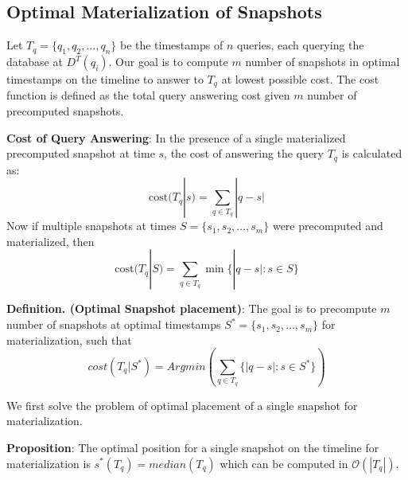 \subsection{Optimal Materialization of Snapshots}
Let $T_q = \{q_1, q_2, \dots, q_n\}$ be the timestamps of $n$ queries, each 
querying the database at $D^T(q_i)$. Our goal is to compute $m$ number of snapshots in optimal timestamps on the timeline to answer to $T_q$ at lowest possible cost. The cost function is defined as the total query answering cost given $m$ number of precomputed snapshots.

\textbf{Cost of Query Answering}: In the presence of a single materialized precomputed snapshot at time $s$, the cost of answering the query $T_q$ is calculated as:
$$\mathrm{cost}(T_q | s) = \sum_{q\in T_q} |q - s|$$
Now if multiple snapshots at times $S=\{s_1, s_2, \dots, s_m\}$ were precomputed and materialized, then 
$$\mathrm{cost}(T_q|S) = \sum_{q\in T_q} \min\{|q-s| : s\in S\}$$

\textbf{Definition. (Optimal Snapshot placement)}: The goal is to precompute $m$ number of snapshots at optimal timestamps $S^*=\{s_1, s_2, \dots, s_m\}$ for materialization, such that 
$$cost(T_q|S^*)= Arg min(\sum_{q\in T_q}\{|q - s|:s \in S^*\})$$

We first solve the problem of optimal placement of a single snapshot for materialization.

\textbf{Proposition}: The optimal position for a single snapshot on the timeline for materialization is $s^*(T_q)=median(T_q)$ which can be computed in $\mathcal{O}(|T_q|)$.


